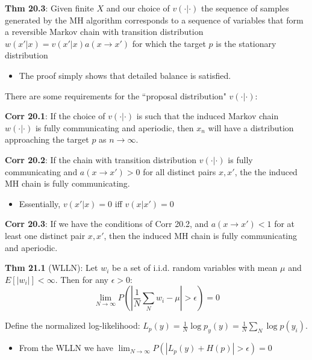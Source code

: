 \documentclass[12pt]{article} %
\begin{document}
\textbf{Thm 20.3}: Given finite $X$ and our choice of $v(\cdot|\cdot)$ the sequence of samples generated by the MH algorithm corresponds to a sequence of variables that form a reversible Markov chain with transition distribution $w(x'|x) = v(x'|x) a(x \rightarrow x')$ for which the target $p$ is the stationary distribution
\begin{itemize}[topsep=-1pt, itemsep=-1pt]
    \item The proof simply shows that detailed balance is satisfied.
\end{itemize}

There are some requirements for the ``proposal distribution" $v(\cdot|\cdot)$:

\textbf{Corr 20.1}: If the choice of $v(\cdot|\cdot)$ is such that the induced Markov chain $w(\cdot|\cdot)$ is fully communicating and aperiodic, then $x_n$ will have a distribution approaching the target $p$ as $n\rightarrow \infty$.

\textbf{Corr 20.2}: If the chain with transition distribution $v(\cdot|\cdot)$ is fully communicating and $a(x \rightarrow x') > 0$ for all distinct pairs $x,x'$, the the induced MH chain is fully communicating.
\begin{itemize}[topsep=-1pt, itemsep=-1pt]
    \item Essentially, $v(x'|x) = 0$ iff $v(x|x') = 0$
\end{itemize}

\textbf{Corr 20.3}: If we have the conditions of Corr 20.2, and $a(x \rightarrow x') < 1$ for at least one distinct pair $x,x'$, then the induced MH chain is fully communicating and aperiodic.

\newpage
{}

\textbf{Thm 21.1} (WLLN): Let $w_i$ be a set of i.i.d. random variables with mean $\mu$ and $E[|w_i|] < \infty$. Then for any $\epsilon > 0$:
\begin{equation*}
    \lim_{N \rightarrow \infty}
    P \left( 
    \left| 
    \frac{1}{N}
    \sum_N w_i - \mu
    \right|
    > \epsilon
    \right)
    = 0
\end{equation*}

Define the normalized log-likelihood: $L_p(y) = \frac{1}{N} \log p_y(y) = \frac{1}{N} \sum_N \log p(y_i)$.
\begin{itemize}[topsep=-1pt, itemsep=-1pt]
    \item 
From the WLLN we have $\lim_{N \rightarrow \infty} P(|L_p(y) + H(p)| > \epsilon) = 0$
\end{itemize}
\end{document}
